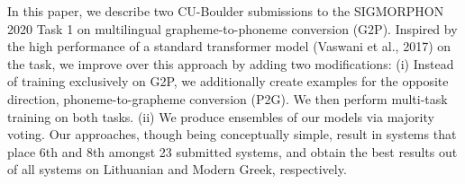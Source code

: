 In this paper, we describe two CU-Boulder submissions to the SIGMORPHON 2020 Task 1 on multilingual grapheme-to-phoneme conversion (G2P). Inspired by the high performance of a standard transformer model (Vaswani et al., 2017) on the task, we improve over this approach by adding two modifications: (i) Instead of training exclusively on G2P, we additionally create examples for the opposite direction, phoneme-to-grapheme conversion (P2G). We then perform multi-task training on both tasks. (ii) We produce ensembles of our models via majority voting. Our approaches, though being conceptually simple, result in systems that place 6th and 8th amongst 23 submitted systems, and obtain the best results out of all systems on Lithuanian and Modern Greek, respectively.
